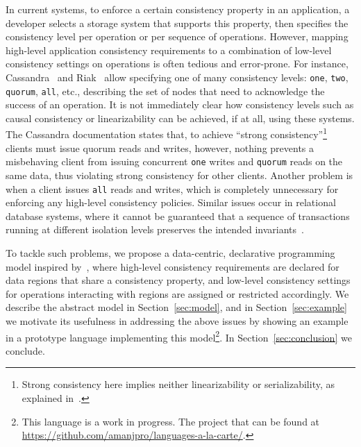 \documentclass[preprint,numbers]{sigplanconf}
\begin{document}
In current systems, to enforce a certain consistency
property in an application, a developer selects a storage system that
supports this property, then specifies the consistency level per
operation or per
sequence of operations. However, mapping high-level application consistency requirements to a combination of
low-level consistency settings on operations is often tedious and error-prone.
For instance, Cassandra~\cite{lakshman2010cassandra} and Riak~\cite{riak} allow 
specifying one of many consistency levels:
\texttt{one}, \texttt{two}, \texttt{quorum}, \texttt{all}, etc., describing
the set of nodes that need to
acknowledge the success of an operation. It
is not immediately clear how consistency levels such as causal consistency or
linearizability can be achieved, if at all, using these systems. The Cassandra documentation
states that,
to achieve ``strong consistency''\footnote{Strong consistency here implies
neither linearizability or serializability, as explained 
in~\cite{sivaramakrishnan2016representation}.} clients must issue quorum reads and writes,
however, nothing prevents a misbehaving client from issuing concurrent \texttt{one} writes and
\texttt{quorum} reads on the same data, thus violating strong consistency for other clients. Another
problem is when a client issues \texttt{all} reads and writes, which is completely
unnecessary for enforcing any high-level consistency policies. Similar issues
occur in relational database systems, where it cannot be guaranteed that a
sequence of transactions running at different isolation levels preserves the intended
invariants~\cite{gray1992transaction}. 

To tackle such problems, we propose a data-centric, declarative programming
model inspired by~\cite{dolby2012data}, where
high-level consistency requirements are declared for data regions that share a
consistency property, and low-level consistency settings for operations interacting with
regions are assigned or restricted accordingly. We
describe the abstract model in Section~\ref{sec:model}, and in
Section~\ref{sec:example} we motivate its usefulness in addressing the above issues by showing
an example in a prototype language implementing this model\footnote{This
  language is a work in progress. The project that can be found at
  \url{https://github.com/amanjpro/languages-a-la-carte/}.}.
In Section~\ref{sec:conclusion} we conclude.
\end{document}
